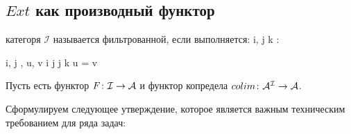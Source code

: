 \documentclass[../main.tex]{subfiles}
\begin{document}
\subsection{$Ext$ как производный функтор}
\begin{to_def}
категоря $\mathcal{I}$ называется фильтрованной, если выполняется:
    \be
            \forall i, j \in {} \quad \exists k : \quad
    \ee
    \be
            \forall i, j \in {}, u, v \colon i \to j \quad \exists \omega \colon j \to k \colon \omega u = \omega v \quad
    \ee
\end{to_def}

Пусть есть функтор $F\colon \mathcal{I}\to \mathcal{A}$ и функтор копредела $colim \colon \mathcal{A}^{\mathcal{I}}\to \mathcal{A}$.

Сформулируем следующее утверждение, которое является важным техническим требованием для ряда задач:\\
\end{document}
